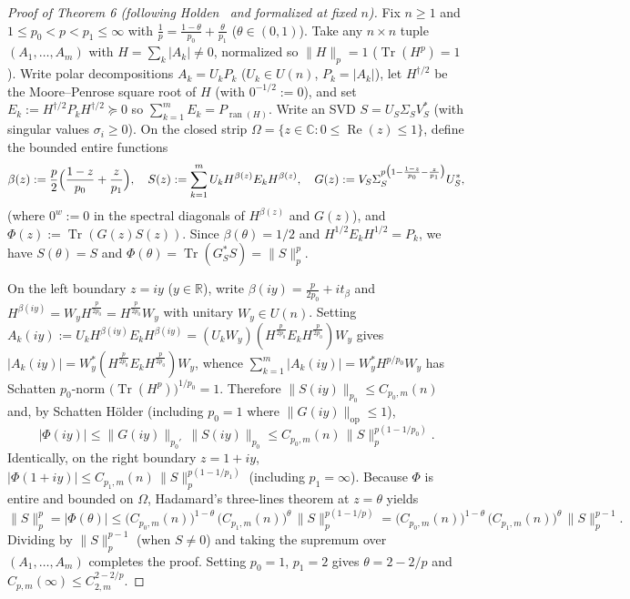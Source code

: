 \documentclass[10pt,letterpaper]{article}
\newcommand{\C}{\mathbb{C}}
\newcommand{\R}{\mathbb{R}}
\newcommand{\Tr}{\operatorname{Tr}}
\newcommand{\ran}{\operatorname{ran}}
\newcommand{\op}{\mathrm{op}}
\begin{document}
\begin{proof}[Proof of Theorem 6 (following Holden~{\cite[\S6]{Holden2026b}} and formalized at fixed $n$)]
Fix $n \ge 1$ and $1 \le p_0 < p < p_1 \le \infty$ with $\frac{1}{p} = \frac{1-\theta}{p_0} + \frac{\theta}{p_1}$ ($\theta \in (0,1)$). Take any $n\times n$ tuple $(A_1,\dots,A_m)$ with $H = \sum_k |A_k| \neq 0$, normalized so $\|H\|_p = 1$ ($\Tr(H^p) = 1$). Write polar decompositions $A_k = U_k P_k$ ($U_k \in U(n)$, $P_k = |A_k|$), let $H^{\dagger/2}$ be the Moore--Penrose square root of $H$ (with $0^{-1/2} := 0$), and set $E_k := H^{\dagger/2} P_k H^{\dagger/2} \succeq 0$ so $\sum_{k=1}^m E_k = P_{\ran(H)}$. Write an SVD $S = U_S \Sigma_S V_S^*$ (with singular values $\sigma_i \ge 0$). On the closed strip $\Omega = \{z \in \C : 0 \le \operatorname{Re}(z) \le 1\}$, define the bounded entire functions
\[
  \beta(z) := \frac{p}{2}\Bigl(\frac{1-z}{p_0} + \frac{z}{p_1}\Bigr), \quad
  S(z) := \sum_{k=1}^m U_k H^{\beta(z)} E_k H^{\beta(z)}, \quad
  G(z) := V_S \Sigma_S^{p\bigl(1 - \frac{1-z}{p_0} - \frac{z}{p_1}\bigr)} U_S^*,
\]
(where $0^w := 0$ in the spectral diagonals of $H^{\beta(z)}$ and $G(z)$), and $\Phi(z) := \Tr(G(z) S(z))$. Since $\beta(\theta) = 1/2$ and $H^{1/2} E_k H^{1/2} = P_k$, we have $S(\theta) = S$ and $\Phi(\theta) = \Tr(G_S^* S) = \|S\|_p^p$.

On the left boundary $z = iy$ ($y \in \R$), write $\beta(iy) = \frac{p}{2p_0} + i t_\beta$ and $H^{\beta(iy)} = W_y H^{\frac{p}{2p_0}} = H^{\frac{p}{2p_0}} W_y$ with unitary $W_y \in U(n)$. Setting $A_k(iy) := U_k H^{\beta(iy)} E_k H^{\beta(iy)} = (U_k W_y)(H^{\frac{p}{2p_0}} E_k H^{\frac{p}{2p_0}}) W_y$ gives $|A_k(iy)| = W_y^*(H^{\frac{p}{2p_0}} E_k H^{\frac{p}{2p_0}}) W_y$, whence $\sum_{k=1}^m |A_k(iy)| = W_y^* H^{p/p_0} W_y$ has Schatten $p_0$-norm $\bigl(\Tr(H^p)\bigr)^{1/p_0} = 1$. Therefore $\|S(iy)\|_{p_0} \le C_{p_0,m}(n)$ and, by Schatten H\"older (including $p_0 = 1$ where $\|G(iy)\|_{\op} \le 1$),
\[
  |\Phi(iy)| \le \|G(iy)\|_{p_0'}\, \|S(iy)\|_{p_0} \le C_{p_0,m}(n)\,\|S\|_p^{p(1 - 1/p_0)}.
\]
Identically, on the right boundary $z = 1 + iy$, $|\Phi(1 + iy)| \le C_{p_1,m}(n)\,\|S\|_p^{p(1 - 1/p_1)}$ (including $p_1 = \infty$). Because $\Phi$ is entire and bounded on $\Omega$, Hadamard's three-lines theorem at $z = \theta$ yields
\[
  \|S\|_p^p = |\Phi(\theta)| \le \bigl(C_{p_0,m}(n)\bigr)^{1-\theta}\,\bigl(C_{p_1,m}(n)\bigr)^{\theta}\,\|S\|_p^{p(1 - 1/p)} = \bigl(C_{p_0,m}(n)\bigr)^{1-\theta}\,\bigl(C_{p_1,m}(n)\bigr)^{\theta}\,\|S\|_p^{p-1}.
\]
Dividing by $\|S\|_p^{p-1}$ (when $S \neq 0$) and taking the supremum over $(A_1,\dots,A_m)$ completes the proof. Setting $p_0 = 1$, $p_1 = 2$ gives $\theta = 2 - 2/p$ and $C_{p,m}(\infty) \le C_{2,m}^{2 - 2/p}$.
\end{proof}
\end{document}
